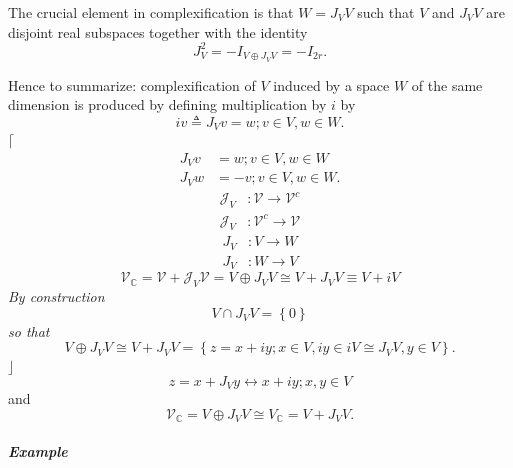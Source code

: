 \documentclass[aps,preprint]{revtex4}
\begin{document}
The crucial element in complexification is that $W=J_{V}V$ such that $V$ and 
$J_{V}V$ are disjoint real subspaces together with the identity 
\begin{equation}
J_{V}^{2}=-I_{V\oplus J_{V}V}=-I_{2r}.
\end{equation}

Hence to summarize: complexification of $V$ induced by a space $W$ of the
same dimension is produced by defining multiplication by $i$ by 
\begin{equation}
iv\triangleq J_{V}v=w;v\in V,w\in W.
\end{equation}
$\lceil$%
\begin{align}
J_{V}v & =w;v\in V,w\in W \\
J_{V}w & =-v;v\in V,w\in W.
\end{align}%
\begin{align}
\mathcal{J}_{V} & :\mathcal{V}\rightarrow\mathcal{V}^{c} \\
\mathcal{J}_{V} & :\mathcal{V}^{c}\rightarrow\mathcal{V}
\end{align}%
\begin{align}
J_{V} & :V\rightarrow W \\
J_{V} & :W\rightarrow V
\end{align}%
\begin{equation}
\mathcal{V}_{\mathbb{C}}=\mathcal{V}+\mathcal{J}_{V}\mathcal{V}=V\oplus
J_{V}V\cong V+J_{V}V\equiv V+iV
\end{equation}
\emph{By construction }%
\begin{equation}
V\cap J_{V}V=\left\{ 0\right\}
\end{equation}
\emph{so that} 
\begin{equation}
V\oplus J_{V}V\cong V+J_{V}V=\left\{ z=x+iy;x\in V,iy\in iV\cong J_{V}V,y\in
V\right\} .
\end{equation}
$\rfloor$ 
\begin{equation}
z=x+J_{V}y\leftrightarrow x+iy;x,y\in V
\end{equation}
and 
\begin{equation}
\mathcal{V}_{\mathbb{C}}=V\oplus J_{V}V\cong V_{\mathbb{C}}=V+J_{V}V.
\end{equation}

\subparagraph{Example}
\end{document}
